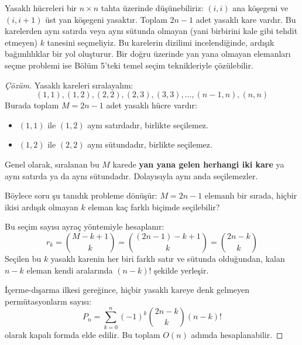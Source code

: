 Yasaklı hücreleri bir $n \times n$ tahta üzerinde düşünebiliriz:
$(i, i)$ ana köşegeni ve $(i, i+1)$ üst yan köşegeni yasaktır. Toplam $2n - 1$ adet yasaklı kare vardır.
Bu karelerden aynı satırda veya aynı sütunda olmayan (yani birbirini kale gibi tehdit etmeyen) $k$ tanesini seçmeliyiz.
Bu karelerin dizilimi incelendiğinde, ardışık bağımlılıklar bir yol oluşturur.
Bir doğru üzerinde yan yana olmayan elemanları seçme problemi ise Bölüm 5'teki temel seçim teknikleriyle çözülebilir.

\begin{proof}[Çözüm]
Yasaklı kareleri sıralayalım:
\[
(1, 1), (1, 2), (2, 2), (2, 3), (3, 3), \dots, (n-1, n), (n, n)
\]
Burada toplam $M = 2n - 1$ adet yasaklı hücre vardır:
\begin{itemize}
    \item $(1, 1)$ ile $(1, 2)$ aynı satırdadır, birlikte seçilemez.
    \item $(1, 2)$ ile $(2, 2)$ aynı sütundadır, birlikte seçilemez.
\end{itemize}
Genel olarak, sıralanan bu $M$ karede \textbf{yan yana gelen herhangi iki kare} ya aynı satırda ya da aynı sütundadır. Dolayısıyla aynı anda seçilemezler.

Böylece soru şu tanıdık probleme dönüşür:
$M = 2n - 1$ elemanlı bir sırada, hiçbir ikisi ardışık olmayan $k$ eleman kaç farklı biçimde seçilebilir?

Bu seçim sayısı ayraç yöntemiyle hesaplanır:
\[
r_k = \binom{M - k + 1}{k} = \binom{(2n - 1) - k + 1}{k} = \binom{2n - k}{k}
\]
Seçilen bu $k$ yasaklı karenin her biri farklı satır ve sütunda olduğundan, kalan $n - k$ eleman kendi aralarında $(n - k)!$ şekilde yerleşir.

İçerme-dışarma ilkesi gereğince, hiçbir yasaklı kareye denk gelmeyen permütasyonların sayısı:
\[
P_n = \sum_{k=0}^n (-1)^k \binom{2n - k}{k} (n - k)!
\]
olarak kapalı formda elde edilir. Bu toplam $O(n)$ adımda hesaplanabilir.
\end{proof}

